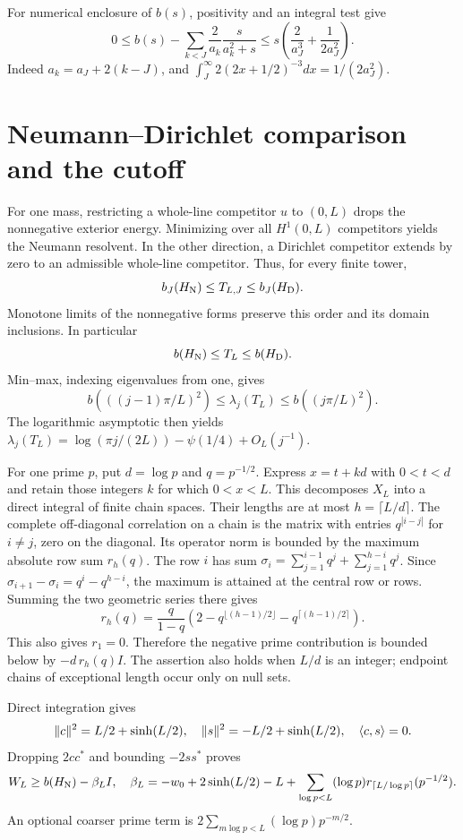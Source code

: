 For numerical enclosure of $b(s)$, positivity and an integral test give
\begin{equation}\label{d:b-tail}
0\le b(s)-\sum_{k<J}\frac2{a_k}\frac{s}{a_k^2+s}
\le s\left(\frac2{a_J^3}+\frac1{2a_J^2}\right).
\end{equation}
Indeed $a_k=a_J+2(k-J)$, and
$\int_J^\infty 2(2x+1/2)^{-3}dx=1/(2a_J^2)$.

\section{Neumann--Dirichlet comparison and the cutoff}
For one mass, restricting a whole-line competitor $u$ to $(0,L)$ drops
the nonnegative exterior energy. Minimizing over all $H^1(0,L)$
competitors yields the Neumann resolvent. In the other direction, a
Dirichlet competitor extends by zero to an admissible whole-line
competitor. Thus, for every finite tower,
\[
b_J(H_{\rm N})\le T_{L,J}\le b_J(H_{\rm D}).
\]
Monotone limits of the nonnegative forms preserve this order and its
domain inclusions. In particular
\begin{equation}\label{d:ND}
b(H_{\rm N})\le T_L\le b(H_{\rm D}).
\end{equation}
Min--max, indexing eigenvalues from one, gives
\[
b(((j-1)\pi/L)^2)\le\lambda_j(T_L)\le b((j\pi/L)^2).
\]
The logarithmic asymptotic then yields
$\lambda_j(T_L)=\log(\pi j/(2L))-\psi(1/4)+O_L(j^{-1})$.

For one prime $p$, put $d=\log p$ and $q=p^{-1/2}$. Express $x=t+kd$
with $0<t<d$ and retain those integers $k$ for which $0<x<L$.
This decomposes $X_L$ into a direct integral of finite chain spaces.
Their lengths are at most $h=\lceil L/d\rceil$. The complete off-diagonal
correlation on a chain is the matrix with entries
$q^{|i-j|}$ for $i\ne j$, zero on the diagonal. Its operator norm is
bounded by the maximum absolute row sum $r_h(q)$. The row $i$ has
sum $\sigma_i=\sum_{j=1}^{i-1}q^j+\sum_{j=1}^{h-i}q^j$.
Since $\sigma_{i+1}-\sigma_i=q^i-q^{h-i}$, the maximum is attained
at the central row or rows. Summing the two geometric series there gives
\[
r_h(q)=\frac q{1-q}
\left(2-q^{\lfloor(h-1)/2\rfloor}-q^{\lceil(h-1)/2\rceil}\right).
\]
This also gives $r_1=0$. Therefore the negative prime contribution is
bounded below by $-d\,r_h(q)I$. The assertion also
holds when $L/d$ is an integer; endpoint chains of exceptional length
occur only on null sets.

Direct integration gives
\[
\lVert c\rVert^2=L/2+\sinh(L/2),\quad
\lVert s\rVert^2=-L/2+\sinh(L/2),\quad\langle c,s\rangle=0.
\]
Dropping $2cc^*$ and bounding $-2ss^*$ proves
\begin{equation}\label{d:beta}
W_L\ge b(H_{\rm N})-\beta_LI,
\quad\beta_L=-w_0+2\sinh(L/2)-L+
\sum_{\log p<L}(\log p)r_{\lceil L/\log p\rceil}(p^{-1/2}).
\end{equation}
An optional coarser prime term is
$2\sum_{m\log p<L}(\log p)p^{-m/2}$.

